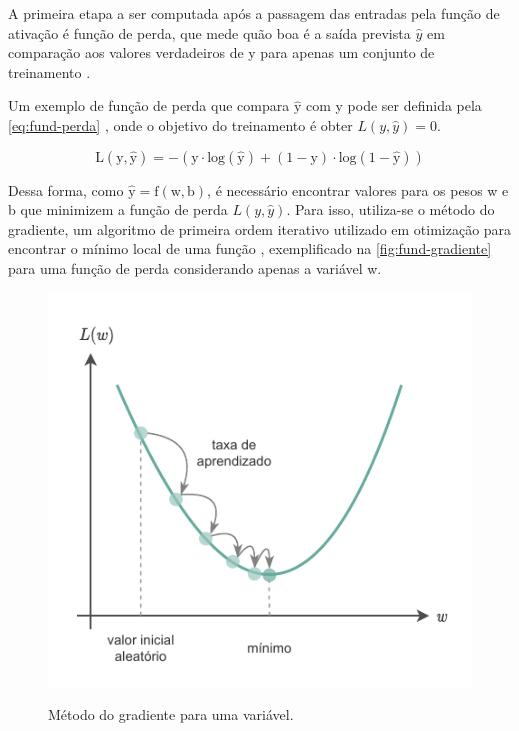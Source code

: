 A primeira etapa a ser computada após a passagem das entradas pela função de ativação é função de perda, que mede quão boa é a saída prevista $\hat{y}$ em comparação aos valores verdadeiros de y para apenas um conjunto de treinamento \cite{ref:Ng}.

Um exemplo de função de perda que compara $\mathrm{\hat{y}}$ com y pode ser definida pela \autoref{eq:fund-perda} \cite{ref:Ng}, onde o objetivo do treinamento é obter $L(y,\hat{y}) = 0$.

\begin{equation} \label{eq:fund-perda}
  \mathrm{
    L(y,\hat{y}) = -(y \cdot log(\hat{y}) + (1 - y) \cdot log(1 - \hat{y}))
  }
\end{equation}

Dessa forma, como $\mathrm{\hat{y} = f(w, b)}$, é necessário encontrar valores para os pesos w e b que minimizem a função de perda $L(y,\hat{y})$. Para isso, utiliza-se o método do gradiente, um algoritmo de primeira ordem iterativo utilizado em otimização para encontrar o mínimo local de uma função \cite{ref:Yan}, exemplificado na \autoref{fig:fund-gradiente} para uma função de perda considerando apenas a variável w.

\begin{figure}[h!] %
  \centering
  \caption{Método do gradiente para uma variável.}
  \includegraphics[scale=1.3]{img/img-fundamentacao-gradiente.pdf}
  \label{fig:fund-gradiente}
\end{figure}


